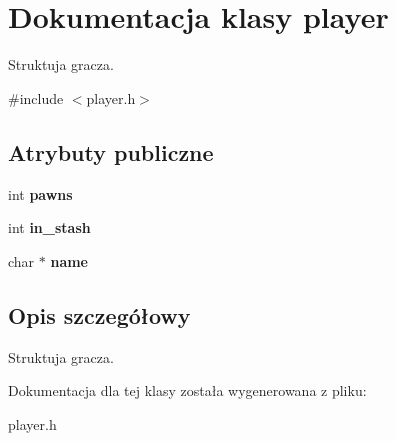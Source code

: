 \hypertarget{structplayer}{}\section{Dokumentacja klasy player}
\label{structplayer}


Struktuja gracza.  




{\ttfamily \#include $<$player.\+h$>$}

\subsection*{Atrybuty publiczne}
\begin{DoxyCompactItemize}
\item 
int {\bfseries pawns}\hypertarget{structplayer_ac324cb782faa8689b1516ba54f6dfae3}{}\label{structplayer_ac324cb782faa8689b1516ba54f6dfae3}

\item 
int {\bfseries in\+\_\+stash}\hypertarget{structplayer_ab649f20ffcb98bd133d93f7950f3e4f3}{}\label{structplayer_ab649f20ffcb98bd133d93f7950f3e4f3}

\item 
char $\ast$ {\bfseries name}\hypertarget{structplayer_a27bb715521eb5315f3b6238d11061817}{}\label{structplayer_a27bb715521eb5315f3b6238d11061817}

\end{DoxyCompactItemize}


\subsection{Opis szczegółowy}
Struktuja gracza. 

Dokumentacja dla tej klasy została wygenerowana z pliku\+:\begin{DoxyCompactItemize}
\item 
player.\+h\end{DoxyCompactItemize}
